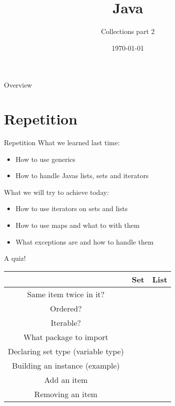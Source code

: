 


\title{Java}
\subtitle{Collections part 2}
\date{\today}

\usepackage{color}



\begin{frame}
\titlepage
\end{frame}

\begin{frame}{Overview}
\tableofcontents
\end{frame}

\section{Repetition}
\begin{frame}{Repetition}
	What we learned last time:
	\begin{itemize}
		\item How to use generics
		\item How to handle Javas lists, sets and iterators
	\end{itemize}
	What we will try to achieve today:
	\begin{itemize}
		\item How to use iterators on sets and lists
		\item How to use maps and what to with them
		\item What exceptions are and how to handle them
	\end{itemize}
\end{frame}

\begin{frame}{A quiz!}
	\begin{tabular}{c|c|c}
		&Set&List\\
		\hline
		\pause
		Same item twice in it? &&\\
		\hline
		Ordered?&&\\
		\hline
		Iterable?&&\\
		\hline
		What package to import &&\\
		\hline
		Declaring set type (variable type)&&\\
		\hline
		Building an instance (example)&&\\
		\hline
		Add an item&&\\
		\hline
		Removing an item&&\\
		
	\end{tabular}
\end{frame}

